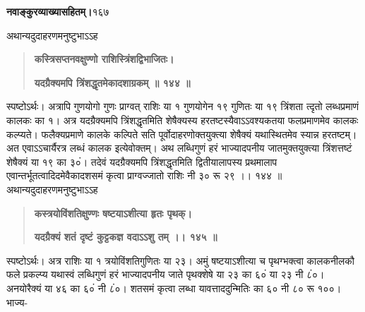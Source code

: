\documentclass[11pt, openany]{book}
\begin{document}
\onehalfspacing
\hspace{2in}\textbf{नवाङ्कुरव्याख्यासहितम्।}\hspace{2in}१६७

\vspace{5mm}

\begin{sloppypar}
\hangindent=0.2in \hspace{0.2in}अथान्यदुदाहरणमनुष्टुभाऽऽह\textendash

\begin{quote}
\hspace{1in}\textbf{कस्त्रिसप्तनवक्षुण्णो राशिस्त्रिंशद्विभाजितः।}

\hspace{1in}\textbf{यदग्रैक्यमपि त्रिंशद्धृतमेकादशाग्रकम् ॥ १४४ ॥}
\end{quote}

\hangindent=0.2in \hspace{0.2in}स्पष्टोऽर्थः। अत्रापि गुणयोगो गुणः प्राग्वत् राशिः या १ गुणयोगेन १९ गुणितः या १९ \textbar त्रिंशता त्दृतो लब्धप्रमाणं कालकः का १। अत्र यदग्रैक्यमपि त्रिंशद्धृतमिति शेषैक्यस्य हरतष्टस्यैवाऽऽवश्यकतया फलप्रमाणमेव कालकः कल्प्यते। फलैक्यप्रमाणे कालके कल्पिते सति पूर्वोदाहरणोक्तयुक्त्या शेषैक्यं यथास्थितमेव स्यान्न हरतष्टम्। अत एवाऽऽचार्यैरत्र लब्धं कालक इत्येवोक्तम्। अथ लब्धिगुणं हरं भाज्यादपनीय जातमुक्तयुक्त्या त्रिंशत्तष्टं शेषैक्यं या १९ का ३०ं। तदेवं यदग्रैक्यमपि त्रिंशद्धृतमिति द्वितीयालापस्य प्रथमालाप एवान्तर्भूतत्वादिदमेवैकादशसमं कृत्वा प्राग्वज्जातो राशिः नी ३० रू २९ ।। १४४ ॥\\

\hangindent=0.2in \hspace{0.2in}अथान्यदुदाहरणमनुष्टुभाऽऽह\textendash

\begin{quote}
\hspace{1in}\textbf{कस्त्रयोविंशतिक्षुण्णः षष्टयाऽशीत्या हृतः पृथक्।}

\hspace{1in}\textbf{यदग्रैक्यं शतं दृष्टं कुट्टकज्ञ वदाऽऽशु तम् ।। १४५ ॥}
\end{quote}

\hangindent=0.2in \hspace{0.2in}स्पष्टोऽर्थः। अत्र राशिः या १ त्रयोविंशतिगुणितः या २३। अमुं षष्टयाऽशीत्या च पृथग्भक्त्वा कालकनीलकौ फले प्रकल्प्य यथास्वं लब्धिगुणं हरं भाज्यादपनीय जाते पृथक्शेषे या २३ का ६०ं या २३ नी ८ं०। अनयोरैक्यं या ४६ का ६०ं नी ८ं०। शतसमं कृत्वा लब्धा यावत्ताददुन्मितिः का ६० नी ८० रू १००।भाज्य-


\end{sloppypar}
\end{document}

